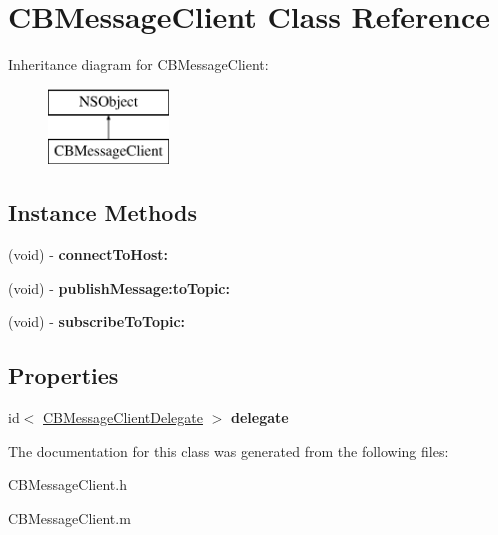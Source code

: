 \hypertarget{interface_c_b_message_client}{\section{C\-B\-Message\-Client Class Reference}
\label{interface_c_b_message_client}
}
Inheritance diagram for C\-B\-Message\-Client\-:\begin{figure}[H]
\begin{center}
\leavevmode
\includegraphics[height=2.000000cm]{interface_c_b_message_client}
\end{center}
\end{figure}
\subsection*{Instance Methods}
\begin{DoxyCompactItemize}
\item 
\hypertarget{interface_c_b_message_client_aa4f3f4ff5be3929038bf6045846738cf}{(void) -\/ {\bfseries connect\-To\-Host\-:}}\label{interface_c_b_message_client_aa4f3f4ff5be3929038bf6045846738cf}

\item 
\hypertarget{interface_c_b_message_client_abcbd056a8bdffbb5c00299343c1b0aeb}{(void) -\/ {\bfseries publish\-Message\-:to\-Topic\-:}}\label{interface_c_b_message_client_abcbd056a8bdffbb5c00299343c1b0aeb}

\item 
\hypertarget{interface_c_b_message_client_a5a2d3e7f602801310df4c29fef97c85e}{(void) -\/ {\bfseries subscribe\-To\-Topic\-:}}\label{interface_c_b_message_client_a5a2d3e7f602801310df4c29fef97c85e}

\end{DoxyCompactItemize}
\subsection*{Properties}
\begin{DoxyCompactItemize}
\item 
\hypertarget{interface_c_b_message_client_a6a94ee89f64cbc4bef855ecdda6fbf85}{id$<$ \hyperlink{protocol_c_b_message_client_delegate-p}{C\-B\-Message\-Client\-Delegate} $>$ {\bfseries delegate}}\label{interface_c_b_message_client_a6a94ee89f64cbc4bef855ecdda6fbf85}

\end{DoxyCompactItemize}


The documentation for this class was generated from the following files\-:\begin{DoxyCompactItemize}
\item 
C\-B\-Message\-Client.\-h\item 
C\-B\-Message\-Client.\-m\end{DoxyCompactItemize}
